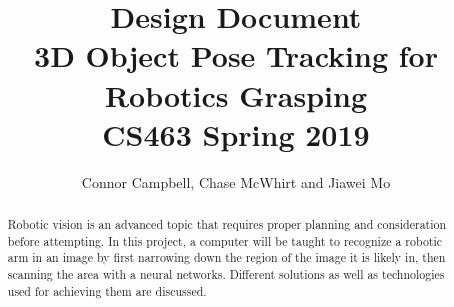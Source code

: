 \documentclass[10pt,journal,compsoc, draftclsnofoot,onecolumn]{IEEEtran}
\begin{document}
\title{
Design Document\\
3D Object Pose Tracking for Robotics Grasping\\
CS463 Spring 2019
}
\author{Connor Campbell, Chase McWhirt and Jiawei Mo}

\maketitle

\begin{abstract}
Robotic vision is an advanced topic that requires proper planning and consideration before attempting. In this project, a computer will be taught to recognize a robotic arm in an image by first narrowing down the region of the image it is likely in, then scanning the area with a neural networks. Different solutions as well as technologies used for achieving them are discussed.
\end{abstract}

\IEEEdisplaynontitleabstractindextext
\IEEEpeerreviewmaketitle

\pagebreak
\tableofcontents
\pagebreak
\end{document}
